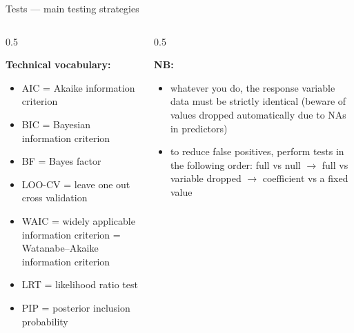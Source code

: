 \documentclass[
  10pt,
  ignorenonframetext,
  aspectratio=169,
  t]{beamer}
\providecommand{\tightlist}{%
  \setlength{\itemsep}{0pt}\setlength{\parskip}{0pt}}
\begin{document}
\begin{frame}{Tests --- main testing strategies}
\vspace{1em}

\begin{columns}[T]
\begin{column}{0.5\linewidth}
\pause

\textbf{Technical vocabulary:}

\begin{itemize}
\tightlist
\item
  AIC = Akaike information criterion
\item
  BIC = Bayesian information criterion
\item
  BF = Bayes factor
\item
  LOO-CV = leave one out cross validation
\item
  WAIC = widely applicable information criterion = Watanabe--Akaike
  information criterion
\item
  LRT = likelihood ratio test
\item
  PIP = posterior inclusion probability
\end{itemize}
\end{column}

\begin{column}{0.5\linewidth}
\pause

\textbf{NB:}

\begin{itemize}
\tightlist
\item
  whatever you do, the response variable data must be strictly identical
  (beware of values dropped automatically due to NAs in predictors)
\item
  to reduce false positives, perform tests in the following order: full
  vs null \(\rightarrow\) full vs variable dropped \(\rightarrow\)
  coefficient vs a fixed value
\end{itemize}
\end{column}
\end{columns}
\end{frame}
\end{document}
